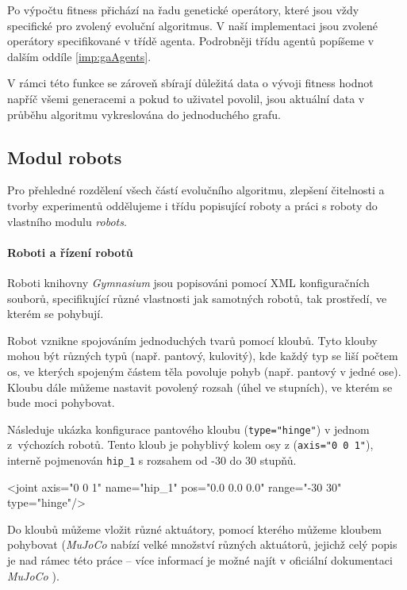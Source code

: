 Po výpočtu fitness přichází na řadu genetické operátory, které jsou vždy
specifické pro zvolený evoluční algoritmus. V naší implementaci jsou zvolené
operátory specifikované v třídě agenta. Podrobněji třídu agentů
popíšeme v dalším oddíle \ref{imp:gaAgents}.

V rámci této funkce se zároveň sbírají důležitá data o vývoji fitness hodnot
napříč všemi generacemi a pokud to uživatel povolil, jsou aktuální data v
průběhu algoritmu vykreslována do jednoduchého grafu.

\subsection{Modul robots} \label{imp:robots}
Pro přehledné rozdělení všech částí evolučního algoritmu, zlepšení čitelnosti a
tvorby experimentů oddělujeme i třídu popisující roboty a práci s roboty do
vlastního modulu \emph{robots}. 

\paragraph{Roboti a řízení robotů}
Roboti knihovny \emph{Gymnasium} jsou popisováni pomocí XML konfiguračních
souborů, specifikující různé vlastnosti jak samotných robotů, tak prostředí, ve
kterém se pohybují. 

Robot vznikne spojováním jednoduchých tvarů pomocí kloubů. Tyto klouby mohou
být různých typů (např. pantový, kulovitý), kde každý typ se liší počtem os, ve
kterých spojeným částem těla povoluje pohyb (např. pantový v jedné ose).
Kloubu dále můžeme nastavit povolený rozsah (úhel ve stupních), ve kterém se
bude moci pohybovat. 

Následuje ukázka konfigurace pantového kloubu (\texttt{type="hinge"}) v jednom
z~výchozích robotů. Tento kloub je pohyblivý kolem osy z (\texttt{axis="0 0
1"}), interně pojmenován \texttt{hip\_1} s rozsahem od -30 do 30 stupňů.
\begin{code}
<joint axis="0 0 1" name="hip_1" pos="0.0 0.0 0.0" range="-30 30" 
 type="hinge"/>
\end{code}

Do kloubů můžeme vložit různé aktuátory, pomocí kterého můžeme kloubem
pohybovat (\emph{MuJoCo} nabízí velké množství různých aktuátorů, jejichž celý
popis je nad rámec této práce -- více informací je možné najít v oficiální
dokumentaci \emph{MuJoCo} \citep{modeling-mujocodocumentation}). 

